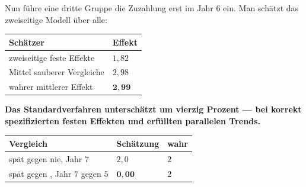 \begin{warnung}
Nun führe eine dritte Gruppe die Zuzahlung erst im Jahr $6$ ein. Man schätzt das zweiseitige Modell über alle:

\begin{center}
{\small
\renewcommand{\arraystretch}{1.48}
\begin{tabular}{@{}P{4.2cm}P{2.4cm}@{}}
\toprule
\textbf{Schätzer} & \textbf{Effekt}\\
\midrule
zweiseitige feste Effekte & $1{,}82$\\
Mittel sauberer Vergleiche & $2{,}98$\\
\midrule
wahrer mittlerer Effekt & $\mathbf{2{,}99}$\\
\bottomrule
\end{tabular}}
\end{center}

\begin{center}
\begin{minipage}{0.9\textwidth}
\textbf{Das Standardverfahren unterschätzt um vierzig Prozent --- bei korrekt spezifizierten festen Effekten und erfüllten parallelen Trends.}
\end{minipage}
\end{center}

\begin{center}
\begin{minipage}{0.88\textwidth}
\end{minipage}
\end{center}

\begin{center}
{\small
\renewcommand{\arraystretch}{1.48}
\begin{tabular}{@{}P{4.4cm}P{2.0cm}P{1.6cm}@{}}
\toprule
\textbf{Vergleich} & \textbf{Schätzung} & \textbf{wahr}\\
\midrule
spät gegen nie, Jahr $7$ & $2{,}0$ & $2$\\
spät gegen , Jahr $7$ gegen $5$ & $\mathbf{0{,}00}$ & $2$\\
\bottomrule
\end{tabular}}
\end{center}


\end{warnung}
